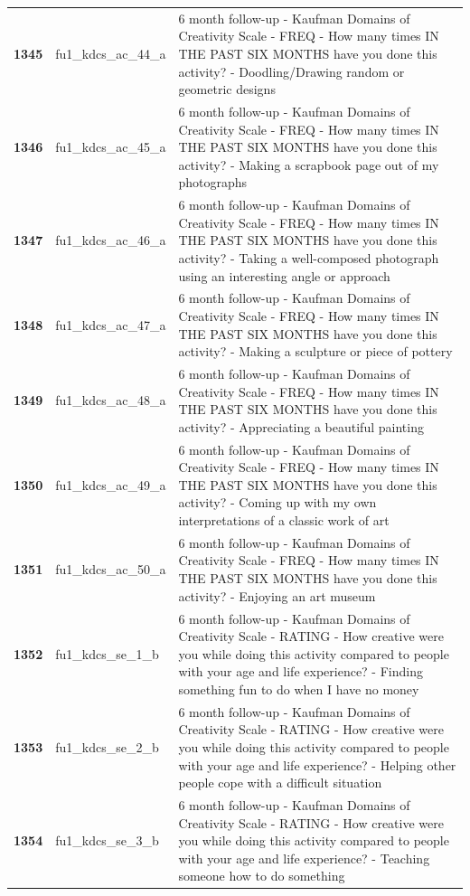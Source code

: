 \documentclass[
  letterpaper,
  DIV=11,
  numbers=noendperiod]{scrartcl}
\begin{document}
\begin{longtable}[t]{>{}cll}
\textbf{1345} & fu1\_kdcs\_ac\_44\_a & 6 month follow-up - Kaufman Domains of Creativity Scale - FREQ - How many times IN THE PAST SIX MONTHS have you done this activity? - Doodling/Drawing random or geometric designs\\
\addlinespace
\textbf{1346} & fu1\_kdcs\_ac\_45\_a & 6 month follow-up - Kaufman Domains of Creativity Scale - FREQ - How many times IN THE PAST SIX MONTHS have you done this activity? - Making a scrapbook page out of my photographs\\
\textbf{1347} & fu1\_kdcs\_ac\_46\_a & 6 month follow-up - Kaufman Domains of Creativity Scale - FREQ - How many times IN THE PAST SIX MONTHS have you done this activity? - Taking a well-composed photograph using an interesting angle or approach\\
\textbf{1348} & fu1\_kdcs\_ac\_47\_a & 6 month follow-up - Kaufman Domains of Creativity Scale - FREQ - How many times IN THE PAST SIX MONTHS have you done this activity? - Making a sculpture or piece of pottery\\
\textbf{1349} & fu1\_kdcs\_ac\_48\_a & 6 month follow-up - Kaufman Domains of Creativity Scale - FREQ - How many times IN THE PAST SIX MONTHS have you done this activity? - Appreciating a beautiful painting\\
\textbf{1350} & fu1\_kdcs\_ac\_49\_a & 6 month follow-up - Kaufman Domains of Creativity Scale - FREQ - How many times IN THE PAST SIX MONTHS have you done this activity? - Coming up with my own interpretations of a classic work of art\\
\addlinespace
\textbf{1351} & fu1\_kdcs\_ac\_50\_a & 6 month follow-up - Kaufman Domains of Creativity Scale - FREQ - How many times IN THE PAST SIX MONTHS have you done this activity? - Enjoying an art museum\\
\textbf{1352} & fu1\_kdcs\_se\_1\_b & 6 month follow-up - Kaufman Domains of Creativity Scale - RATING - How creative were you while doing this activity compared to people with your age and life experience? - Finding something fun to do when I have no money\\
\textbf{1353} & fu1\_kdcs\_se\_2\_b & 6 month follow-up - Kaufman Domains of Creativity Scale - RATING - How creative were you while doing this activity compared to people with your age and life experience? - Helping other people cope with a difficult situation\\
\textbf{1354} & fu1\_kdcs\_se\_3\_b & 6 month follow-up - Kaufman Domains of Creativity Scale - RATING - How creative were you while doing this activity compared to people with your age and life experience? - Teaching someone how to do something\\

\end{longtable}
\end{document}
